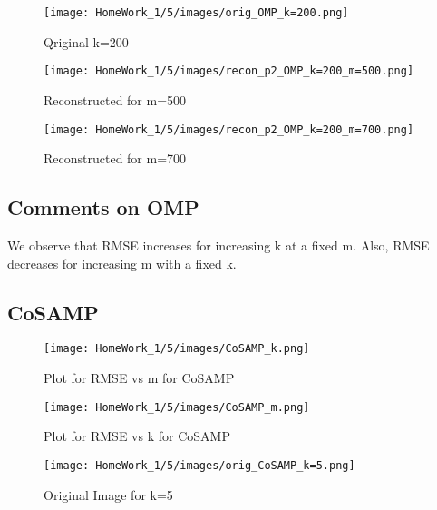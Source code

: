 \documentclass{article}
\begin{document}
\begin{figure}[h!]
    \centering
    \begin{minipage}{0.1\textwidth}
        \texttt{[image: HomeWork\_1/5/images/orig\_OMP\_k=200.png]}
        \caption{Qriginal k=200}
    \end{minipage}
    \hspace{0.5cm}
    \begin{minipage}{0.1\textwidth}
        \centering
        \texttt{[image: HomeWork\_1/5/images/recon\_p2\_OMP\_k=200\_m=500.png]}
        \caption{Reconstructed for m=500}
    \end{minipage}
    \hspace{0.5cm}
    \begin{minipage}{0.1\textwidth}
        \centering
        \texttt{[image: HomeWork\_1/5/images/recon\_p2\_OMP\_k=200\_m=700.png]}
        \caption{Reconstructed for m=700}
    \end{minipage}
\end{figure}
\FloatBarrier
\subsection*{Comments on OMP}
We observe that RMSE increases for increasing k at a fixed m. Also, RMSE decreases for increasing m with a fixed k.
\FloatBarrier
\subsection*{CoSAMP}
\begin{figure}[h!]
    \centering
        \centering
        \texttt{[image: HomeWork\_1/5/images/CoSAMP\_k.png]}
        \caption{Plot for RMSE vs m for CoSAMP}
\end{figure}
\begin{figure}[h!]
        \centering
        \texttt{[image: HomeWork\_1/5/images/CoSAMP\_m.png]}
        \caption{Plot for RMSE vs k for CoSAMP}
\end{figure}
\begin{figure}[h!]
        \centering
        \texttt{[image: HomeWork\_1/5/images/orig\_CoSAMP\_k=5.png]}
        \caption{Original Image for k=5}
\end{figure}
\end{document}
